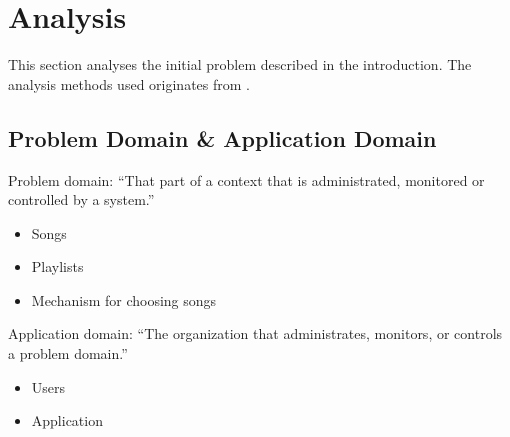 \chapter{Analysis}

This section analyses the initial problem described in the introduction. The analysis methods used originates from \cite{mathiassen2001objektorienteret}. 

\section{Problem Domain \& Application Domain}

Problem domain: \enquote{That part of a context that is administrated, monitored or controlled by a system.}


\begin{itemize}
  \item Songs
  \item Playlists
  \item Mechanism for choosing songs
\end{itemize}

Application domain: \enquote{The organization that administrates, monitors, or controls a problem domain.}

\begin{itemize}
  \item Users
  \item Application
\end{itemize}


